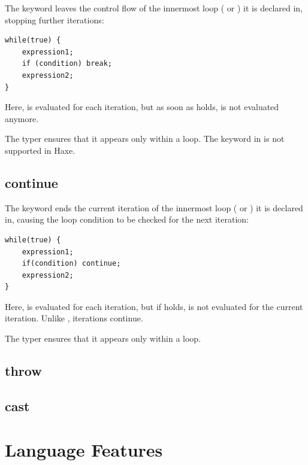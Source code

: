 \documentclass{haxe}
\begin{document}
The  keyword leaves the control flow of the innermost loop ( or ) it is declared in, stopping further iterations:

\begin{lstlisting}
while(true) {
	expression1;
	if (condition) break;
	expression2;
}
\end{lstlisting}

Here,  is evaluated for each iteration, but as soon as  holds,  is not evaluated anymore.

The typer ensures that it appears only within a loop. The  keyword in  is not supported in Haxe.


\section{continue}
\label{expression-continue}

The  keyword ends the current iteration of the innermost loop ( or ) it is declared in, causing the loop condition to be checked for the next iteration:

\begin{lstlisting}
while(true) {
	expression1;
	if(condition) continue;
	expression2;
}
\end{lstlisting}

Here,  is evaluated for each iteration, but if  holds,  is not evaluated for the current iteration. Unlike , iterations continue.

The typer ensures that it appears only within a loop.


\section{throw}
\label{expression-throw}

\section{cast}
\label{expression-cast}





\chapter{Language Features}
\label{lf}
\end{document}
